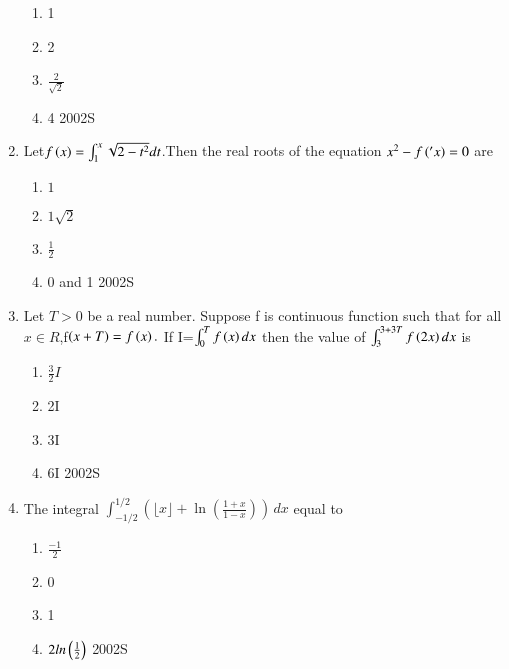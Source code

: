 \documentclass[journal,12pt,twocolumn]{IEEEtran}
\theoremstyle{remark}
\begin{document}
\begin{enumerate}
\begin{enumerate}
 \item  1
 \item  2
 \item  $\frac{2}{\sqrt{2}}$
 \item  4
 \hfill{{2002S}}
\end{enumerate}
\item Let$f\left(x\right)=\int_{1}^{x}\sqrt{2-{t}^2} dt $.Then the real roots of the equation ${x}^2-f\left('x\right)=0$ are 
\begin{enumerate}
  \item ${1}$
  \item ${1}{\sqrt2}$
  \item $\frac{1}{2}$
   \item 0 and 1
   \hfill{{2002S}}
   \end{enumerate}
   \item Let $T>0$ be a real number. Suppose f is continuous function such that for all ${x}\in{R}$,f$\left(x+T\right)=f\left(x\right).$
   If I=$\int_{0}^{T}f\left(x\right)dx$ then the value of $\int_{3}^{3+3T} f\left(2x\right) dx $ is
\begin{enumerate}
	\item $\frac{3}{2}{I}$
   \item 2I
   \item 3I
   \item 6I
   \hfill{{2002S}}
   \end{enumerate}
   \item The integral $\int_{-1/2}^{1/2} \left( \lfloor x \rfloor + \ln \left( \frac{1+x}{1-x} \right) \right) \, dx$ equal to
\begin{enumerate}[label=(\alph*)]
	\item $\frac{-1}{2}$
 \item 0
 \item 1
 \item $2ln\left(\frac{1}{2}\right)$
 \hfill{2002S}
 \end{enumerate}




\end{enumerate}
\end{document}
